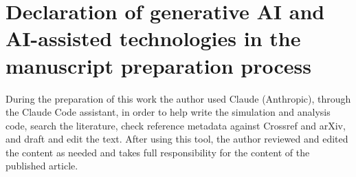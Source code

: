 \documentclass[preprint,12pt,authoryear]{elsarticle}
\theoremstyle{remark}
\begin{document}
\section*{Declaration of generative AI and AI-assisted technologies in the manuscript preparation process}
During the preparation of this work the author used Claude (Anthropic), through the Claude Code
assistant, in order to help write the simulation and analysis code, search the literature, check reference
metadata against Crossref and arXiv, and draft and edit the text. After using this tool, the author reviewed
and edited the content as needed and takes full responsibility for the content of the published article.



\end{document}
